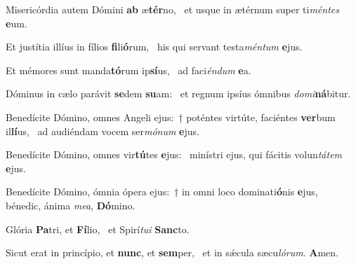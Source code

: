 \item Misericórdia autem Dómini \textbf{ab} æ\textbf{tér}no,~\psstar{} et usque in ætérnum super ti\textit{méntes} \textbf{e}um.
\item Et justítia illíus in fílios \textbf{fi}li\textbf{ó}rum,~\psstar{} his qui servant testa\textit{méntum} \textbf{e}jus.
\item Et mémores sunt manda\textbf{tó}rum ip\textbf{sí}us,~\psstar{} ad faci\textit{éndum} \textbf{e}a.
\item Dóminus in cælo parávit \textbf{se}dem \textbf{su}am:~\psstar{} et regnum ipsíus ómnibus \textit{domi}\textbf{ná}bitur.
\item Benedícite Dómino, omnes Angeli ejus:~† poténtes virtúte, faciéntes \textbf{ver}bum il\textbf{lí}us,~\psstar{} ad audiéndam vocem ser\textit{mónum} \textbf{e}jus.
\item Benedícite Dómino, omnes vir\textbf{tú}tes \textbf{e}jus:~\psstar{} minístri ejus, qui fácitis volun\textit{tátem} \textbf{e}jus.
\item Benedícite Dómino, ómnia ópera ejus:~† in omni loco dominati\textbf{ó}nis \textbf{e}jus,~\psstar{} bénedic, ánima \textit{mea}, \textbf{Dó}mino.
\item Glória \textbf{Pa}tri, et \textbf{Fí}lio,~\psstar{} et Spirí\textit{tui} \textbf{Sanc}to.
\item Sicut erat in princípio, et \textbf{nunc}, et \textbf{sem}per,~\psstar{} et in sǽcula sæcu\textit{lórum}. \textbf{A}men.